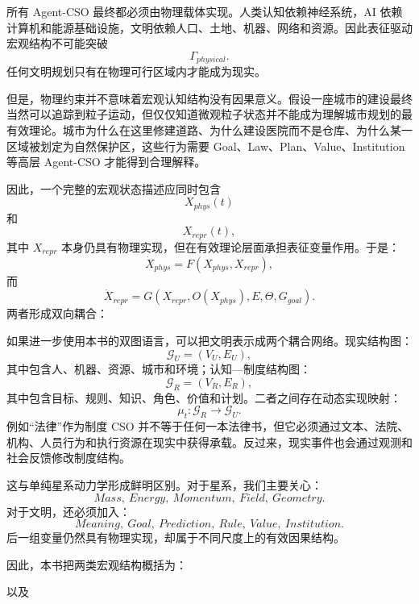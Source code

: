 所有 Agent-CSO 最终都必须由物理载体实现。人类认知依赖神经系统，AI 依赖计算机和能源基础设施，文明依赖人口、土地、机器、网络和资源。因此表征驱动宏观结构不可能突破
\[
\Gamma_{physical}.
\]
任何文明规划只有在物理可行区域内才能成为现实。

但是，物理约束并不意味着宏观认知结构没有因果意义。假设一座城市的建设最终当然可以追踪到粒子运动，但仅仅知道微观粒子状态并不能成为理解城市规划的最有效理论。城市为什么在这里修建道路、为什么建设医院而不是仓库、为什么某一区域被划定为自然保护区，这些行为需要 Goal、Law、Plan、Value、Institution 等高层 Agent-CSO 才能得到合理解释。

因此，一个完整的宏观状态描述应同时包含
\[
X_{phys}(t)
\]
和
\[
X_{repr}(t),
\]
其中 $X_{repr}$ 本身仍具有物理实现，但在有效理论层面承担表征变量作用。于是：
\[
\dot X_{phys}
=
F
\left(
X_{phys},
X_{repr}
\right),
\]
而
\[
\dot X_{repr}
=
G
\left(
X_{repr},
O(X_{phys}),
E,
\Theta,
G_{goal}
\right).
\]
两者形成双向耦合：
\begin{statementbox}
\centering
{}
\end{statementbox}

如果进一步使用本书的双图语言，可以把文明表示成两个耦合网络。现实结构图：
\[
\mathcal G_U
=
(V_U,E_U),
\]
其中包含人、机器、资源、城市和环境；认知—制度结构图：
\[
\mathcal G_R
=
(V_R,E_R),
\]
其中包含目标、规则、知识、角色、价值和计划。二者之间存在动态实现映射：
\[
\mu_t:
\mathcal G_R
\rightarrow
\mathcal G_U.
\]
例如“法律”作为制度 CSO 并不等于任何一本法律书，但它必须通过文本、法院、机构、人员行为和执行资源在现实中获得承载。反过来，现实事件也会通过观测和社会反馈修改制度结构。

这与单纯星系动力学形成鲜明区别。对于星系，我们主要关心：
\[
Mass,\ Energy,\ Momentum,\ Field,\ Geometry.
\]
对于文明，还必须加入：
\[
Meaning,\ Goal,\ Prediction,\ Rule,\ Value,\ Institution.
\]
后一组变量仍然具有物理实现，却属于不同尺度上的有效因果结构。

因此，本书把两类宏观结构概括为：

\begin{statementbox}
\centering
{}
\end{statementbox}

以及

\begin{statementbox}
\centering
{}
\end{statementbox}

